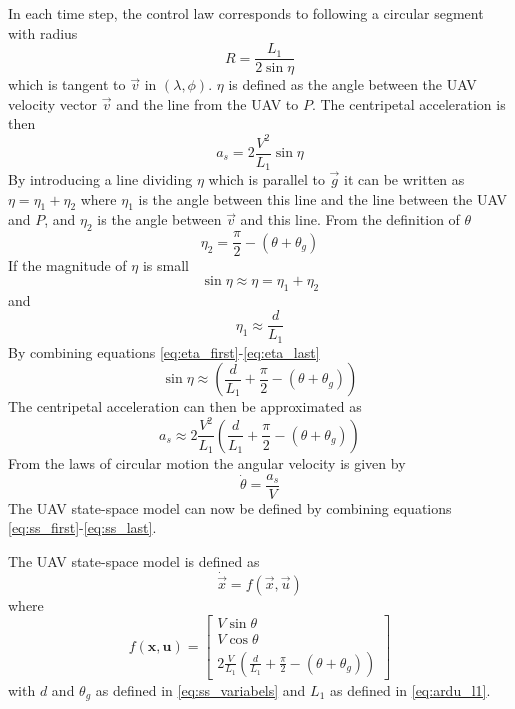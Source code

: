  In each time step, the control law corresponds to following a circular segment with radius
 \begin{equation}
    R=\frac{L_1}{2\sin\eta}
 \end{equation}
 which is tangent to $\vec{v}$ in $(\lambda,\phi)$.
 $\eta$ is defined as the angle between the UAV velocity vector $\vec{v}$ and the line from the UAV to $P$. The centripetal acceleration is then 
\begin{equation}
    a_s=2\frac{V^2}{L_1}\sin\eta
\end{equation}
By introducing a line dividing $\eta$ which is parallel to $\vec{g}$ it can be written as $\eta=\eta_1+\eta_2$ where $\eta_1$ is the angle between this line and the line between the UAV and $P$, and $\eta_2$ is the angle between $\vec{v}$ and this line. From the definition of $\theta$
\begin{equation}\label{eq:eta_first}
    \eta_2=\frac{\pi}{2} - (\theta+\theta_g)
\end{equation}
If the magnitude of $\eta$ is small
\begin{equation}
    \sin\eta\approx\eta=\eta_1+\eta_2
\end{equation} 
and
\begin{equation}\label{eq:eta_last}
    \eta_1\approx \frac{d}{L_1}
\end{equation}
By combining equations \eqref{eq:eta_first}-\eqref{eq:eta_last}
\begin{equation}
    \sin\eta\approx\left(\frac{d}
    {L_1} + \frac{\pi}{2} - (\theta+\theta_g)\right)
\end{equation}
The centripetal acceleration can then be approximated as
\begin{equation}
    a_s\approx2\frac{V^2}{L_1}\left(\frac{d}{L_1} + \frac{\pi}{2} - (\theta+\theta_g)\right)
\end{equation}
From the laws of circular motion the angular velocity is given by
\begin{equation}\label{eq:ss_last}
    \dot{\theta}=\frac{a_s}{V}
\end{equation}
The UAV state-space model can now be defined by combining equations \eqref{eq:ss_first}-\eqref{eq:ss_last}.

\begin{definition}
The UAV state-space model is defined as 
\begin{equation}
    \dot{\vec{x}} = f(\vec{x}, \vec{u})
\end{equation}
where
\begin{equation}
    f(\mathbf{x}, \mathbf{u}) = \begin{bmatrix}
    V\sin\theta \\
    V\cos\theta \\
    2\frac{V}{L_1}\left(\frac{d}{L_1} + \frac{\pi}{2} - (\theta +\theta_g)\right)
    \end{bmatrix}
\end{equation}
with $d$ and $\theta_g$ as defined in \eqref{eq:ss_variabels} and $L_1$ as defined in \eqref{eq:ardu_l1}.
\end{definition}


